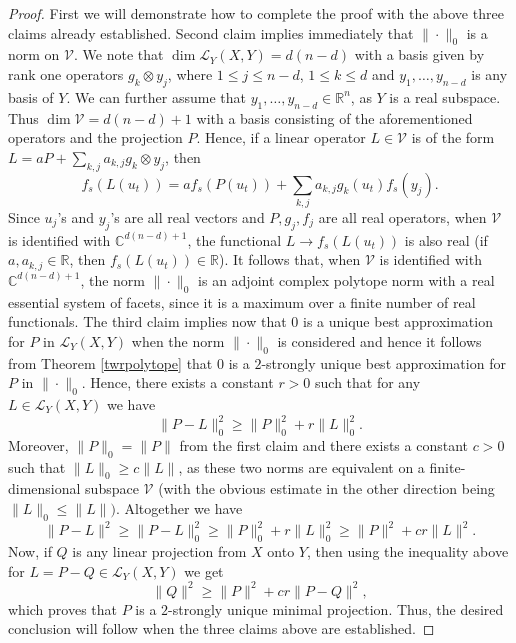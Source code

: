 \documentclass[12pt, reqno]{amsart}
\theoremstyle{definition}
\theoremstyle{remark}
\numberwithin{equation}{section}
\begin{document}
\begin{proof}
First we will demonstrate how to complete the proof with the above three claims already established. Second claim implies immediately that $\| \cdot \|_0$ is a norm on $\mathcal{V}$. We note that $\dim \mathcal{L}_Y(X, Y) = d(n-d)$ with a basis given by rank one operators $g_k \otimes y_j$, where $1 \leq j \leq n-d$, $1 \leq k \leq d$ and $y_1, \ldots, y_{n-d}$ is any basis of $Y$. We can further assume that $y_1, \ldots, y_{n-d} \in \mathbb{R}^n$, as $Y$ is a real subspace. Thus $\dim \mathcal{V} = d(n-d)+1$ with a basis consisting of the aforementioned operators and the projection $P$. Hence, if a linear operator $L \in \mathcal{V}$ is of the form $L=aP + \sum_{k, j} a_{k, j} g_k \otimes y_j$, then 
$$f_s(L(u_t))=af_s(P(u_t)) + \sum _{k, j} a_{k, j} g_k(u_t) f_s(y_j).$$
Since $u_j$'s and $y_j$'s are all real vectors and $P, g_j, f_j$ are all real operators, when $\mathcal{V}$ is identified with $\mathbb{C}^{d(n-d)+1}$, the functional $L \to f_s(L(u_t))$ is also real (if $a, a_{k, j} \in \mathbb{R}$, then $f_s(L(u_t)) \in \mathbb{R}$). It follows that, when $\mathcal{V}$ is identified with $\mathbb{C}^{d(n-d)+1}$, the norm $\| \cdot \|_0$ is an adjoint complex polytope norm with a real essential system of facets, since it is a maximum over a finite number of real functionals. The third claim implies now that $0$ is a unique best approximation for $P$ in $\mathcal{L}_Y(X, Y)$ when the norm $\| \cdot \|_0$ is considered and hence it follows from Theorem \ref{twrpolytope} that $0$ is a $2$-strongly unique best approximation for $P$ in $\| \cdot \|_0$. Hence, there exists a constant $r>0$ such that for any $L \in \mathcal{L}_Y(X, Y)$ we have
$$\|P-L\|_0^2 \geq \|P\|_0^2 + r \|L\|_0^2.$$
Moreover, $\|P\|_0 = \|P\|$ from the first claim and there exists a constant $c>0$ such that $\|L\|_0 \geq c \|L\|$, as these two norms are equivalent on a finite-dimensional subspace $\mathcal{V}$ (with the obvious estimate in the other direction being $\|L\|_0 \leq \|L\|)$. Altogether we have
$$\|P-L\|^2 \geq \|P-L\|_0^2 \geq \|P\|_0^2 + r \|L\|_0^2 \geq \|P\|^2 + cr \|L\|^2.$$
Now, if $Q$ is any linear projection from $X$ onto $Y$, then using the inequality above for $L = P-Q \in \mathcal{L}_Y(X, Y)$ we get
$$\|Q\|^2 \geq \|P\|^2 + cr \|P-Q\|^2,$$
which proves that $P$ is a $2$-strongly unique minimal projection. Thus, the desired conclusion will follow when the three claims above are established.


\end{proof}
\end{document}
